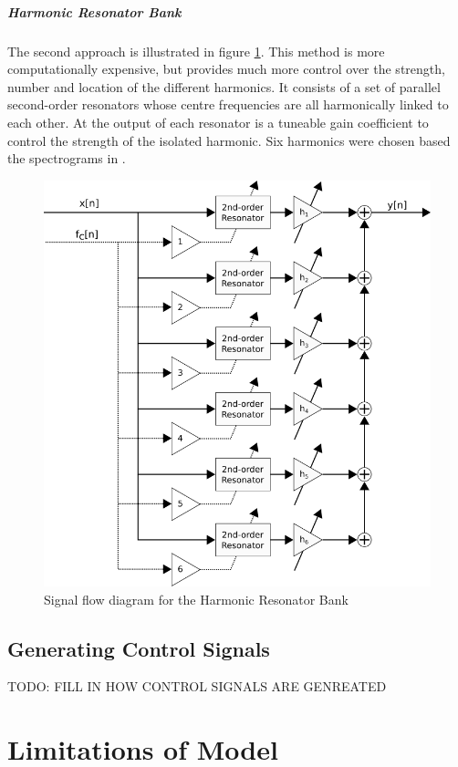 \documentclass[../main.tex]{subfiles}
\begin{document}
\subparagraph{Harmonic Resonator Bank}
The second approach is illustrated in figure \ref{fig:HRB}. This method is more computationally expensive, but provides much more control over the strength, number and location of the different harmonics. It consists of a set of parallel second-order resonators whose centre frequencies are all harmonically linked to each other. At the output of each resonator is a tuneable gain coefficient to control the strength of the isolated harmonic. Six harmonics were chosen based the spectrograms in .

\begin{figure}[h]
    \centering
    \includegraphics[scale=.5]{./images/diagrams/HarmonicResonatorBank.png}
    \caption{Signal flow diagram for the Harmonic Resonator Bank}
    \label{fig:HRB}
\end{figure}

\clearpage

\subsection{Generating Control Signals}
TODO: FILL IN HOW CONTROL SIGNALS ARE GENREATED

\section{Limitations of Model}
\end{document}
